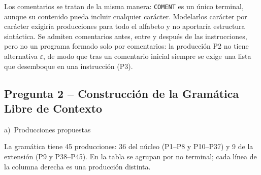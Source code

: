 \documentclass[11pt,letterpaper]{article}
\newcommand{\letra}[2]{\par\medskip\noindent #1)~#2\par\smallskip}
\begin{document}
Los comentarios se tratan de la misma manera: \lstinline|COMENT| es un único terminal, aunque su contenido
pueda incluir cualquier carácter. Modelarlos carácter por carácter exigiría producciones para todo el
alfabeto y no aportaría estructura sintáctica. Se admiten comentarios antes, entre y después de las
instrucciones, pero no un programa formado solo por comentarios: la producción P2 no tiene alternativa
$\varepsilon$, de modo que tras un comentario inicial siempre se exige una lista que desemboque en una
instrucción (P3).

\subsection{Pregunta 2 -- Construcción de la Gramática Libre de Contexto}

\letra{a}{Producciones propuestas}

La gramática tiene 45 producciones: 36 del núcleo (P1--P8 y P10--P37) y 9 de la extensión (P9 y P38--P45).
En la tabla se agrupan por no terminal; cada línea de la columna derecha es una producción distinta.
\end{document}
